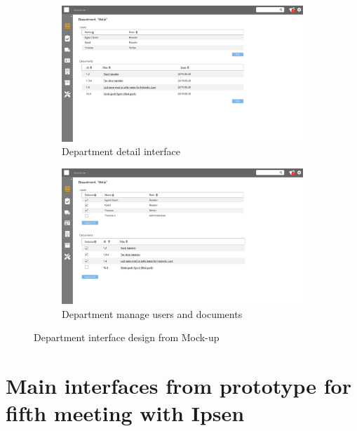 \begin{figure}[H]\ContinuedFloat
	\centering
	\begin{subfigure}[b]{0.48\textwidth}
		\includegraphics[width=\textwidth]{billeder/iteration3Prototyper/Page_25.jpg}
		\caption{Department detail interface}
		\label{fig:5-DepDetail}
	\end{subfigure}
	\quad
	\begin{subfigure}[b]{0.48\textwidth}
		\includegraphics[width=\textwidth]{billeder/iteration3Prototyper/Page_26.jpg}
		\caption{Department manage users and documents}
		\label{fig:5-DepEdit}
	\end{subfigure}
	\caption{Department interface design from Mock-up}\label{fig:5-DepMockUp}
\end{figure}

\section{Main interfaces from prototype for fifth meeting with Ipsen}\label{sec:3prototype}

